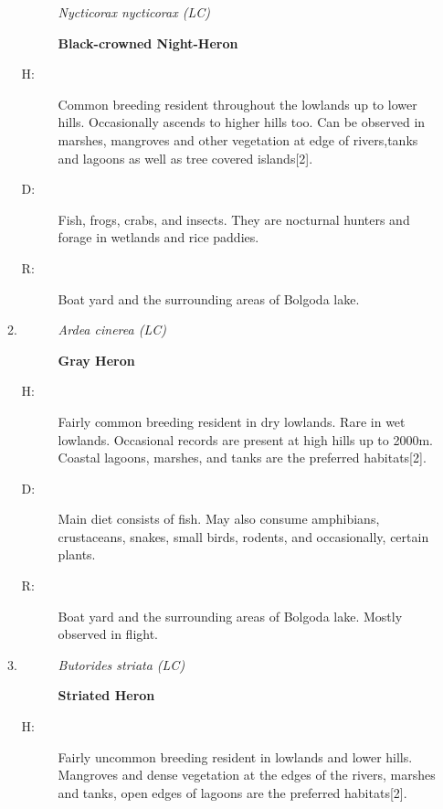 \begin{itemize}
\begin{enumerate}
\begin{description}%
\item[]%
\textit{Nycticorax nycticorax (LC)}%
\item[]%
\textbf{Black{-}crowned Night{-}Heron}%
\end{description}%
\begin{description}%
\item[H: ]%
Common breeding resident throughout the lowlands  up to lower hills. Occasionally ascends to higher hills too. Can be observed in marshes, mangroves and other vegetation at edge of rivers,tanks and lagoons as well as tree covered islands{[}2{]}.%
\item[D: ]%
Fish, frogs, crabs, and insects. They are nocturnal hunters and forage in wetlands and rice paddies.%
\item[R: ]%
Boat yard and the surrounding areas of Bolgoda lake.%
\end{description}%
\item%
\begin{description}%
\item[]%
\textit{Ardea cinerea (LC)}%
\item[]%
\textbf{Gray Heron}%
\end{description}%
\begin{description}%
\item[H: ]%
Fairly common breeding resident in dry lowlands. Rare in wet lowlands. Occasional records are present at high hills up to 2000m. Coastal lagoons, marshes, and tanks are the preferred habitats{[}2{]}.%
\item[D: ]%
Main diet consists of fish. May also consume amphibians, crustaceans, snakes, small birds, rodents, and occasionally, certain plants.%
\item[R: ]%
Boat yard and the surrounding areas of Bolgoda lake. Mostly observed in flight.%
\end{description}%
\item%
\begin{description}%
\item[]%
\textit{Butorides striata (LC)}%
\item[]%
\textbf{Striated Heron}%
\end{description}%
\begin{description}%
\item[H: ]%
Fairly uncommon breeding resident in lowlands and lower hills. Mangroves and dense vegetation at the edges of the rivers, marshes and tanks, open edges of lagoons are the preferred habitats{[}2{]}.%

\end{description}
\end{enumerate}
\end{itemize}
